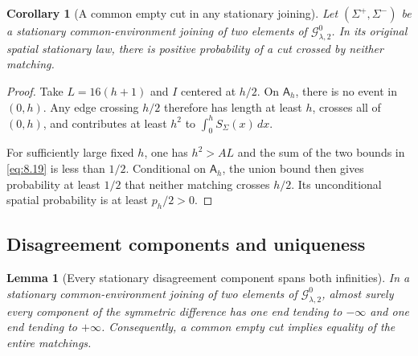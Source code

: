 \documentclass[11pt,reqno]{amsart}
\newtheorem{lemma}[theorem]{Lemma}
\newtheorem{corollary}[theorem]{Corollary}
\theoremstyle{definition}
\theoremstyle{remark}
\numberwithin{equation}{section}
\begin{document}
\begin{corollary}[A common empty cut in any stationary joining]
\label{cor:common-empty-gap}
Let \((\Sigma^+,\Sigma^-)\) be a stationary common-environment
joining of two elements of \(\mathcal G_{\lambda,2}^0\).  In its
original spatial stationary law, there is positive probability of a
cut crossed by neither matching.
\end{corollary}

\begin{proof}
Take \(L=16(h+1)\) and \(I\) centered at \(h/2\).  On
\(\mathsf A_h\), there is no event in \((0,h)\).  Any edge
crossing \(h/2\) therefore has length at least \(h\), crosses
all of \((0,h)\), and contributes at least \(h^2\) to
\(\int_0^h S_\Sigma(x)\,dx\).

For sufficiently large fixed
\(h\), one has \(h^2>AL\) and the sum of the two bounds in
\eqref{eq:8.19} is less than \(1/2\).  Conditional on \(\mathsf A_h\),
the union bound then gives probability at least \(1/2\) that neither
matching crosses \(h/2\).  Its unconditional spatial probability
is at least \(p_h/2>0\).
\end{proof}

\subsection{Disagreement components and uniqueness}

\begin{lemma}[Every stationary disagreement component spans both infinities]
\label{lem:spanning-disagreements}
In a stationary common-environment joining of two elements of
\(\mathcal G_{\lambda,2}^0\), almost surely every component of the
symmetric difference has one end tending to \(-\infty\) and one
end tending to \(+\infty\).  Consequently, a common empty cut
implies equality of the entire matchings.
\end{lemma}
\end{document}
